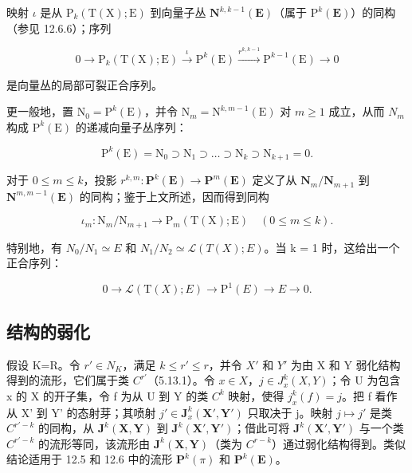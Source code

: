 映射 \(\iota\) 是从 \(\mathrm{P}_{k}(\mathrm{T}(\mathrm{X});\mathrm{E})\) 到向量子丛 \(\mathbf{N}^{k,k - 1}(\mathbf{E})\)（属于 \(\mathrm{P}^k (\mathbf{E})\)）的同构（参见 12.6.6）；序列

\[
0 \rightarrow \mathrm{P}_{k}(\mathrm{T}(\mathrm{X});\mathrm{E}) \xrightarrow {\iota} \mathrm{P}^{k}(\mathrm{E}) \xrightarrow {r^{k,k-1}} \mathrm{P}^{k-1}(\mathrm{E}) \rightarrow 0
\]

是向量丛的局部可裂正合序列。

更一般地，置 \(\mathrm{N}_{0}=\mathrm{P}^{k}(\mathrm{E})\)，并令 \(\mathrm{N}_{m}=\mathrm{N}^{k,m-1}(\mathrm{E})\) 对 \(m\geqslant1\) 成立，从而 \(N_{m}\) 构成 \(\mathrm{P}^{k}(\mathrm{E})\) 的递减向量子丛序列：

\[
\mathrm{P} ^ {k} (\mathrm{E}) = \mathrm{N} _ {0} \supset \mathrm{N} _ {1} \supset \dots \supset \mathrm{N} _ {k} \supset \mathrm{N} _ {k + 1} = 0.
\]

对于 \(0 \leqslant m \leqslant k\)，投影 \(r^{k,m}: \mathbf{P}^{k}(\mathbf{E}) \to \mathbf{P}^{m}(\mathbf{E})\) 定义了从 \(\mathbf{N}_{m}/\mathbf{N}_{m+1}\) 到 \(\mathbf{N}^{m,m-1}(\mathbf{E})\) 的同构；鉴于上文所述，因而得到同构

\[
\iota_ {m} \colon \mathrm{N} _ {m} / \mathrm{N} _ {m + 1} \rightarrow \mathrm{P} _ {m} (\mathrm{T} (\mathrm{X}); \mathrm{E}) \quad (0 \leqslant m \leqslant k).
\]

特别地，有 \(N_{0}/N_{1} \simeq E\) 和 \(N_{1}/N_{2} \simeq \mathcal{L}(T(X); E)\)。当 k = 1 时，这给出一个正合序列：

\[
0 \rightarrow \mathscr {L} (\mathrm{T} (X); E) \rightarrow \mathrm{P} ^ {1} (E) \rightarrow E \rightarrow 0.
\]

\subsection{结构的弱化}

假设 K=R。令 \(r' \in N_{K}\)，满足 \(k \leqslant r' \leqslant r\)，并令 \(X'\) 和 \(Y'\) 为由 X 和 Y 弱化结构得到的流形，它们属于类 \(C^{r'}\)（5.13.1）。令 \(x \in X\)，\(j \in J_{x}^{k}(X, Y)\)；令 U 为包含 x 的 X 的开子集，令 f 为从 U 到 Y 的类 \(C^{k}\) 映射，使得 \(j_{x}^{k}(f) = j\)。把 f 看作从 X' 到 Y' 的态射芽；其喷射 \(j' \in \mathbf{J}_{x}^{k}(\mathbf{X}', \mathbf{Y}')\) 只取决于 j。映射 \(j \mapsto j'\) 是类 \(C^{r'-k}\) 的同构，从 \(\mathbf{J}^{k}(\mathbf{X}, \mathbf{Y})\) 到 \(\mathbf{J}^{k}(\mathbf{X}', \mathbf{Y}')\)；借此可将 \(\mathbf{J}^{k}(\mathbf{X}', \mathbf{Y}')\) 与一个类 \(C^{r'-k}\) 的流形等同，该流形由 \(\mathbf{J}^{k}(\mathbf{X}, \mathbf{Y})\)（类为 \(C^{r-k}\)）通过弱化结构得到。类似结论适用于 12.5 和 12.6 中的流形 \(\mathbf{P}^{k}(\pi)\) 和 \(\mathbf{P}^{k}(\mathbf{E})\)。

